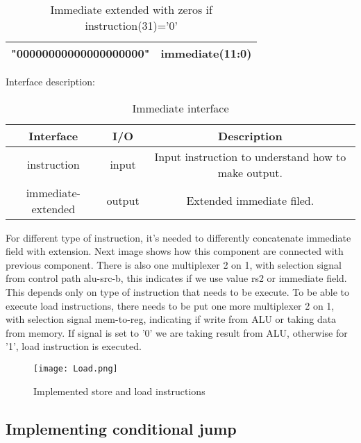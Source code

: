 \documentclass{scrreprt}
\begin{document}
\begin{table}[htb!]
        \centering
        \begin{tabular}{|c|c|} \hline 
             "00000000000000000000" & immediate(11:0)  \\ \hline  
        \end{tabular}
        \caption{Immediate extended with zeros if instruction(31)='0'}
        \label{tab:Zeros interface}
    \end{table}
    \hfill \break
Interface description:
\begin{table}[htb!]
        \centering
        \begin{tabular}{|c|c|c|} \hline 
             Interface & I/O & Description \\ \hline  
             instruction & input & Input instruction to understand how to make output.  \\ \hline  
             immediate-extended & output & Extended immediate filed.  \\ \hline
        \end{tabular}
        \caption{Immediate interface}
        \label{tab:Imm interface}
    \end{table}
    \hfill \break
    \newpage
For different type of instruction, it's needed to differently concatenate immediate field with extension.
Next image shows how this component are connected with previous component. There is also one multiplexer 2 on 1, with selection signal from control path alu-src-b, this indicates if we use value rs2 or immediate field. This depends only on type of instruction that needs to be execute. 
To be able to execute load instructions, there needs to be put one more multiplexer 2 on 1, with selection signal mem-to-reg, indicating if write from ALU or taking data from memory. If signal is set to '0' we are taking result from ALU, otherwise for '1', load instruction is executed. 


\begin{figure}[htb!]
    \centering
    \texttt{[image: Load.png]}
    \caption{Implemented store and load instructions}
    \label{fig:Load&Store}
\end{figure}
\hfill \break
\hfill \break
\hfill \break
\hfill \break
\hfill \break
\hfill \break
\hfill \break
\hfill \break
\hfill \break
\hfill \break
{}
\subsection*{Implementing conditional jump}
\end{document}
